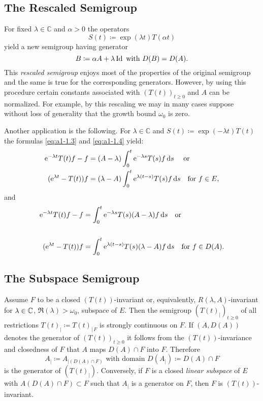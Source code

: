 \subsection{The Rescaled Semigroup}\label{subsec:a1-3.2}
For fixed $\lambda \in \mathbb{C}$ and $\alpha > 0$ the operators
\[
    S(t) \coloneqq \exp(\lambda t)T(\alpha t)
\]
yield a new semigroup having generator
\[
    B \coloneqq \alpha A + \lambda \operatorname{Id} \text{ with } D(B) = D(A) .
\]
This \emph{rescaled semigroup} enjoys most of the properties of the original semigroup and the same is true for the corresponding generators.
However, by using this procedure certain constants associated with $(T(t))_{t \geq 0}$ and $A$ can be normalized.
For example, by this rescaling we may in many cases suppose without loss of generality that the growth bound $\omega_{0}$ is zero.

Another application is the following.
For $\lambda \in \mathbb{C}$ and $S(t) \coloneqq \exp(-\lambda t)T(t)$ the formulas \eqref{eq:a1-1.3} and \eqref{eq:a1-1.4} yield:
\begin{align*}
     \mathrm{e}^{-\lambda t}T(t)f - f &= (A-\lambda) \int_{0}^{t}  \mathrm{e}^{-\lambda s}T(s)f \ds \quad\text{ or }\notag \\
    ( \mathrm{e}^{\lambda t}-T(t))f &= (\lambda-A) \int_{0}^{t}  \mathrm{e}^{\lambda(t-s)}T(s)f \ds \quad \text{for } f \in E, %
\end{align*}
and
\begin{align*}
     \mathrm{e}^{-\lambda t}T(t)f - f &= \int_{0}^{t}  \mathrm{e}^{-\lambda s}T(s)(A-\lambda)f \ds  \quad\text{or}\notag \\
    \notag \\
    ( \mathrm{e}^{\lambda t} - T(t))f &= \int_{0}^{t}  \mathrm{e}^{\lambda(t-s)}T(s)(\lambda-A)f \ds \quad \text{for } f \in D(A). %
\end{align*}
\subsection{The Subspace Semigroup}\label{subsec:a1-3.3}
Assume $F$ to be a closed $(T(t))$-invariant or, equivalently, $R(\lambda,A)$-invariant for 
$\lambda \in \mathbb{C}$, 
$ \Re(\lambda) > \omega_{0}$, subspace of $E$.
Then the semigroup $(T(t)_{|})_{t \geq 0}$ of all restrictions $T(t)_{|} \coloneqq T(t)_{|\,F}$ is strongly continuous on $F$.
If $(A,D(A))$ denotes the generator of $(T(t))_{t \geq 0}$ it follows from the $(T(t))$-invariance and closedness of $F$ that $A$ maps $D(A) \cap F$ into $F$.
Therefore
\[
    A_{|} \coloneqq A_{| (D(A)\cap F)} \text{ with domain } D(A_{|}) \coloneqq D(A) \cap F
\]
is the generator of $(T(t)_{|})$.
%
Conversely, if $F$ is a closed \emph{linear subspace} of $E$ with $A(D(A) \cap F) \subset F$ such that 
$A_{|}$ is a generator on $F$, then $F$ is $(T(t))$-invariant.

